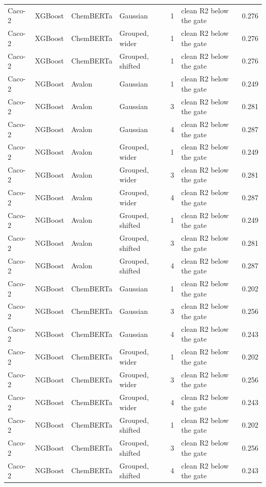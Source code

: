 {\begin{longtable}{llllcll}
Caco-2 & XGBoost & ChemBERTa & Gaussian & 1 & clean R2 below the gate & 0.276 \\
Caco-2 & XGBoost & ChemBERTa & Grouped, wider & 1 & clean R2 below the gate & 0.276 \\
Caco-2 & XGBoost & ChemBERTa & Grouped, shifted & 1 & clean R2 below the gate & 0.276 \\
Caco-2 & NGBoost & Avalon & Gaussian & 1 & clean R2 below the gate & 0.249 \\
Caco-2 & NGBoost & Avalon & Gaussian & 3 & clean R2 below the gate & 0.281 \\
Caco-2 & NGBoost & Avalon & Gaussian & 4 & clean R2 below the gate & 0.287 \\
Caco-2 & NGBoost & Avalon & Grouped, wider & 1 & clean R2 below the gate & 0.249 \\
Caco-2 & NGBoost & Avalon & Grouped, wider & 3 & clean R2 below the gate & 0.281 \\
Caco-2 & NGBoost & Avalon & Grouped, wider & 4 & clean R2 below the gate & 0.287 \\
Caco-2 & NGBoost & Avalon & Grouped, shifted & 1 & clean R2 below the gate & 0.249 \\
Caco-2 & NGBoost & Avalon & Grouped, shifted & 3 & clean R2 below the gate & 0.281 \\
Caco-2 & NGBoost & Avalon & Grouped, shifted & 4 & clean R2 below the gate & 0.287 \\
Caco-2 & NGBoost & ChemBERTa & Gaussian & 1 & clean R2 below the gate & 0.202 \\
Caco-2 & NGBoost & ChemBERTa & Gaussian & 3 & clean R2 below the gate & 0.256 \\
Caco-2 & NGBoost & ChemBERTa & Gaussian & 4 & clean R2 below the gate & 0.243 \\
Caco-2 & NGBoost & ChemBERTa & Grouped, wider & 1 & clean R2 below the gate & 0.202 \\
Caco-2 & NGBoost & ChemBERTa & Grouped, wider & 3 & clean R2 below the gate & 0.256 \\
Caco-2 & NGBoost & ChemBERTa & Grouped, wider & 4 & clean R2 below the gate & 0.243 \\
Caco-2 & NGBoost & ChemBERTa & Grouped, shifted & 1 & clean R2 below the gate & 0.202 \\
Caco-2 & NGBoost & ChemBERTa & Grouped, shifted & 3 & clean R2 below the gate & 0.256 \\
Caco-2 & NGBoost & ChemBERTa & Grouped, shifted & 4 & clean R2 below the gate & 0.243 \\

\end{longtable}}
